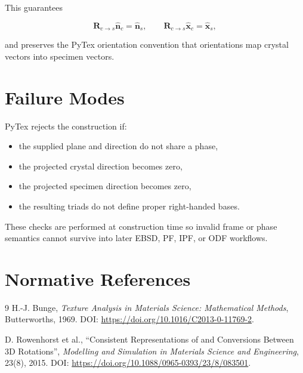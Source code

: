 \documentclass[11pt]{article}
\begin{document}
This guarantees

\[
\mathbf{R}_{c \rightarrow s}\hat{\mathbf{n}}_c = \hat{\mathbf{n}}_s,
\qquad
\mathbf{R}_{c \rightarrow s}\hat{\mathbf{x}}_c = \hat{\mathbf{x}}_s,
\]

and preserves the PyTex orientation convention that orientations map crystal vectors into specimen vectors.

\section{Failure Modes}

PyTex rejects the construction if:

\begin{itemize}
  \item the supplied plane and direction do not share a phase,
  \item the projected crystal direction becomes zero,
  \item the projected specimen direction becomes zero,
  \item the resulting triads do not define proper right-handed bases.
\end{itemize}

These checks are performed at construction time so invalid frame or phase semantics cannot survive into later EBSD, PF, IPF, or ODF workflows.

\section{Normative References}

\begin{thebibliography}{9}
H.-J. Bunge,
\textit{Texture Analysis in Materials Science: Mathematical Methods},
Butterworths, 1969.
DOI: \url{https://doi.org/10.1016/C2013-0-11769-2}.

D. Rowenhorst et al.,
``Consistent Representations of and Conversions Between 3D Rotations'',
\textit{Modelling and Simulation in Materials Science and Engineering}, 23(8), 2015.
DOI: \url{https://doi.org/10.1088/0965-0393/23/8/083501}.
\end{thebibliography}
\end{document}
